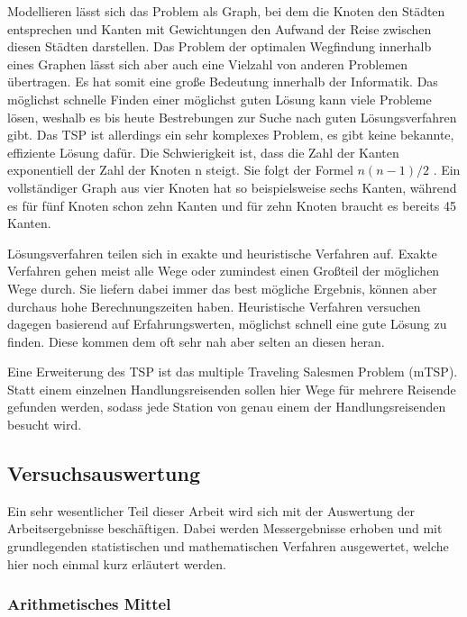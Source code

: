 Modellieren lässt sich das Problem als Graph, bei dem die Knoten den Städten entsprechen und Kanten mit Gewichtungen den Aufwand der Reise zwischen diesen Städten darstellen. Das Problem der optimalen Wegfindung innerhalb eines Graphen lässt sich aber auch eine Vielzahl von anderen Problemen übertragen. Es hat somit eine große Bedeutung innerhalb der Informatik. Das möglichst schnelle Finden einer möglichst guten Lösung kann viele Probleme lösen, weshalb es bis heute Bestrebungen zur Suche nach guten Lösungsverfahren gibt. \cite{travelingSalesman} Das TSP ist allerdings ein sehr komplexes Problem, es gibt keine bekannte, effiziente Lösung dafür. Die Schwierigkeit ist, dass die Zahl der Kanten exponentiell der Zahl der Knoten n steigt. Sie folgt der Formel $n(n-1)/2$ \cite{graphenEckenKanten}. Ein vollständiger Graph aus vier Knoten hat so beispielsweise sechs Kanten, während es für fünf Knoten schon zehn Kanten und für zehn Knoten braucht es bereits 45 Kanten.

Lösungsverfahren teilen sich in exakte und heuristische Verfahren auf. Exakte Verfahren gehen meist alle Wege oder zumindest einen Großteil der möglichen Wege durch. Sie liefern dabei immer das best mögliche Ergebnis, können aber durchaus hohe Berechnungszeiten haben. Heuristische Verfahren versuchen dagegen basierend auf Erfahrungswerten, möglichst schnell eine gute Lösung zu finden. Diese kommen dem oft sehr nah aber selten an diesen heran. \cite{travelingSalesman}

Eine Erweiterung des TSP ist das multiple Traveling Salesmen Problem (mTSP). Statt einem einzelnen Handlungsreisenden sollen hier Wege für mehrere Reisende gefunden werden, sodass jede Station von genau einem der Handlungsreisenden besucht wird. \cite{mtsp}

\subsection{Versuchsauswertung}

Ein sehr wesentlicher Teil dieser Arbeit wird sich mit der Auswertung der Arbeitsergebnisse beschäftigen. Dabei werden Messergebnisse erhoben und mit grundlegenden statistischen und mathematischen Verfahren ausgewertet, welche hier noch einmal kurz erläutert werden.

\subsubsection{Arithmetisches Mittel} 

